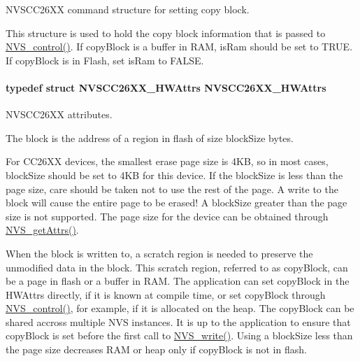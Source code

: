 N\+V\+S\+C\+C26\+X\+X command structure for setting copy block. 

This structure is used to hold the copy block information that is passed to \hyperlink{_n_v_s_8h_adb26bd05e4f063191411ac5ad968b1d9}{N\+V\+S\+\_\+control()}. If copy\+Block is a buffer in R\+A\+M, is\+Ram should be set to T\+R\+U\+E. If copy\+Block is in Flash, set is\+Ram to F\+A\+L\+S\+E. 
\paragraph[{N\+V\+S\+C\+C26\+X\+X\+\_\+\+H\+W\+Attrs}]{\setlength{\rightskip}{0pt plus 5cm}typedef struct {\bf N\+V\+S\+C\+C26\+X\+X\+\_\+\+H\+W\+Attrs}  {\bf N\+V\+S\+C\+C26\+X\+X\+\_\+\+H\+W\+Attrs}}\label{_n_v_s_c_c26_x_x_8h_a38491f6eb4860eab3549daf9ad4c273a}


N\+V\+S\+C\+C26\+X\+X attributes. 

The block is the address of a region in flash of size block\+Size bytes.

For C\+C26\+X\+X devices, the smallest erase page size is 4\+K\+B, so in most cases, block\+Size should be set to 4\+K\+B for this device. If the block\+Size is less than the page size, care should be taken not to use the rest of the page. A write to the block will cause the entire page to be erased! A block\+Size greater than the page size is not supported. The page size for the device can be obtained through \hyperlink{_n_v_s_8h_a6b92f45097f377824524f7a4f33f02b1}{N\+V\+S\+\_\+get\+Attrs()}.

When the block is written to, a scratch region is needed to preserve the unmodified data in the block. This scratch region, referred to as copy\+Block, can be a page in flash or a buffer in R\+A\+M. The application can set copy\+Block in the H\+W\+Attrs directly, if it is known at compile time, or set copy\+Block through \hyperlink{_n_v_s_8h_adb26bd05e4f063191411ac5ad968b1d9}{N\+V\+S\+\_\+control()}, for example, if it is allocated on the heap. The copy\+Block can be shared accross multiple N\+V\+S instances. It is up to the application to ensure that copy\+Block is set before the first call to \hyperlink{_n_v_s_8h_a2c0acbdec0a65dc725019adb65ad282a}{N\+V\+S\+\_\+write()}. Using a block\+Size less than the page size decreases R\+A\+M or heap only if copy\+Block is not in flash. 
